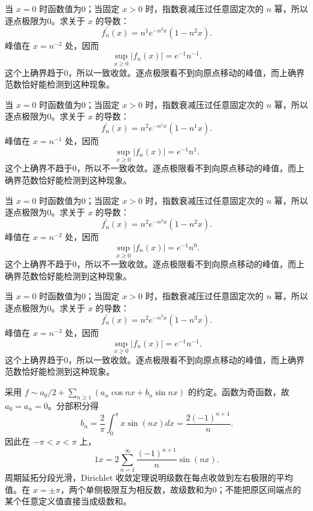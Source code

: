 \documentclass[UTF8,12pt,a4paper,fontset=fandol]{ctexart}
\begin{document}
\begin{solve}\label{ans:c28q9}
当 $x=0$ 时函数值为0；当固定 $x>0$ 时，指数衰减压过任意固定次的 $n$ 幂，所以逐点极限为0。求关于 $x$ 的导数：
\[
f_n^{\prime}(x)=n^{1}e^{-n^{2}x}(1-n^{2}x).
\]
峰值在 $x=n^{-2}$ 处，因而
\[
\sup_{x\ge0}|f_n(x)|=e^{-1}n^{-1}.
\]
这个上确界趋于0，所以一致收敛。逐点极限看不到向原点移动的峰值，而上确界范数恰好能检测到这种现象。
\end{solve}

\begin{solve}\label{ans:c28q10}
当 $x=0$ 时函数值为0；当固定 $x>0$ 时，指数衰减压过任意固定次的 $n$ 幂，所以逐点极限为0。求关于 $x$ 的导数：
\[
f_n^{\prime}(x)=n^{2}e^{-n^{1}x}(1-n^{1}x).
\]
峰值在 $x=n^{-1}$ 处，因而
\[
\sup_{x\ge0}|f_n(x)|=e^{-1}n^{1}.
\]
这个上确界不趋于0，所以不一致收敛。逐点极限看不到向原点移动的峰值，而上确界范数恰好能检测到这种现象。
\end{solve}

\begin{solve}\label{ans:c28q11}
当 $x=0$ 时函数值为0；当固定 $x>0$ 时，指数衰减压过任意固定次的 $n$ 幂，所以逐点极限为0。求关于 $x$ 的导数：
\[
f_n^{\prime}(x)=n^{2}e^{-n^{2}x}(1-n^{2}x).
\]
峰值在 $x=n^{-2}$ 处，因而
\[
\sup_{x\ge0}|f_n(x)|=e^{-1}n^{0}.
\]
这个上确界不趋于0，所以不一致收敛。逐点极限看不到向原点移动的峰值，而上确界范数恰好能检测到这种现象。
\end{solve}

\begin{solve}\label{ans:c28q12}
当 $x=0$ 时函数值为0；当固定 $x>0$ 时，指数衰减压过任意固定次的 $n$ 幂，所以逐点极限为0。求关于 $x$ 的导数：
\[
f_n^{\prime}(x)=n^{2}e^{-n^{3}x}(1-n^{3}x).
\]
峰值在 $x=n^{-3}$ 处，因而
\[
\sup_{x\ge0}|f_n(x)|=e^{-1}n^{-1}.
\]
这个上确界趋于0，所以一致收敛。逐点极限看不到向原点移动的峰值，而上确界范数恰好能检测到这种现象。
\end{solve}

\begin{solve}\label{ans:c28q13}
采用 $f\sim a_0/2+\sum_{n\ge1}(a_n\cos nx+b_n\sin nx)$ 的约定。函数为奇函数，故 $a_0=a_n=0$。分部积分得
\[
b_n=\frac{2}\pi\int_0^\pi x\sin(nx)dx=\frac{2(-1)^{n+1}}n.
\]
因此在 $-\pi<x<\pi$ 上，
\[
1x=2\sum_{n=1}^\infty\frac{(-1)^{n+1}}n\sin(nx).
\]
周期延拓分段光滑，Dirichlet 收敛定理说明级数在每点收敛到左右极限的平均值。在 $x=\pm\pi$，两个单侧极限互为相反数，故级数和为0；不能把原区间端点的某个任意定义值直接当成级数和。
\end{solve}
\end{document}
